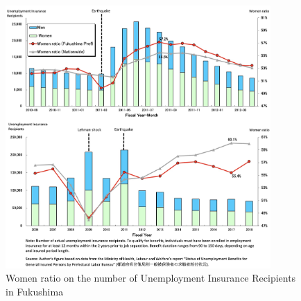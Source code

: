 \documentclass[a4paper,12pt]{article}
\begin{document}


\begin{figure}[h!]
    \centering
    \includegraphics[width=0.9\textwidth]{Number of Actual Unemployment Insurance Recipients2.jpeg}  %
    \caption{Women ratio on the number of Unemployment Insurance Recipients in Fukushima}
    \label{fig:women_ratio_fukushima2}
\end{figure}





\end{document}
